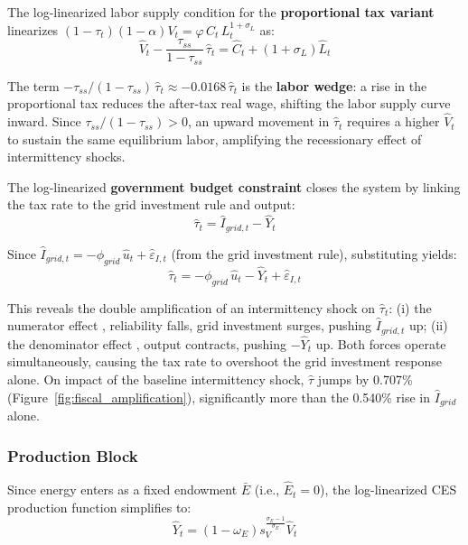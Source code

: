 \documentclass[12pt, a4paper]{article}
\begin{document}
	The log-linearized labor supply condition for the \textbf{proportional tax variant} linearizes $(1-\tau_t)(1-\alpha)V_t = \varphi\,C_t\,L_t^{1+\sigma_L}$ as:
	\begin{equation}
		\hat{V}_t - \frac{\tau_{ss}}{1-\tau_{ss}}\,\hat{\tau}_t = \hat{C}_t + (1+\sigma_L)\hat{L}_t
		\label{eq:labor_lin}
	\end{equation}
	
	The term $-\tau_{ss}/(1-\tau_{ss})\,\hat{\tau}_t \approx -0.0168\,\hat{\tau}_t$ is the \textbf{labor wedge}: a rise in the proportional tax reduces the after-tax real wage, shifting the labor supply curve inward. Since $\tau_{ss}/(1-\tau_{ss}) > 0$, an upward movement in $\hat{\tau}_t$ requires a higher $\hat{V}_t$ to sustain the same equilibrium labor, amplifying the recessionary effect of intermittency shocks.
	
	The log-linearized \textbf{government budget constraint} closes the system by linking the tax rate to the grid investment rule and output:
	\begin{equation}
		\hat{\tau}_t = \hat{I}_{grid,t} - \hat{Y}_t
		\label{eq:tau_lin}
	\end{equation}
	
	Since $\hat{I}_{grid,t} = -\phi_{grid}\,\hat{u}_t + \hat{\varepsilon}_{I,t}$ (from the grid investment rule), substituting yields:
	\begin{equation}
		\hat{\tau}_t = -\phi_{grid}\,\hat{u}_t - \hat{Y}_t + \hat{\varepsilon}_{I,t}
		\label{eq:tau_expanded_lin}
	\end{equation}
	
	This reveals the double amplification of an intermittency shock on $\hat{\tau}_t$: (i) the numerator effect ,  reliability falls, grid investment surges, pushing $\hat{I}_{grid,t}$ up; (ii) the denominator effect ,  output contracts, pushing $-\hat{Y}_t$ up. Both forces operate simultaneously, causing the tax rate to overshoot the grid investment response alone. On impact of the baseline intermittency shock, $\hat{\tau}$ jumps by 0.707\% (Figure~\ref{fig:fiscal_amplification}), significantly more than the 0.540\% rise in $\hat{I}_{grid}$ alone.
	
	\subsubsection{Production Block}
	
	Since energy enters as a fixed endowment $\bar{E}$ (i.e., $\hat{E}_t = 0$), the log-linearized CES production function simplifies to:
	\begin{equation}
		\hat{Y}_t = (1-\omega_E) s_V^{\frac{\sigma_E - 1}{\sigma_E}} \hat{V}_t
		\label{eq:output_lin}
	\end{equation}
	
\end{document}
